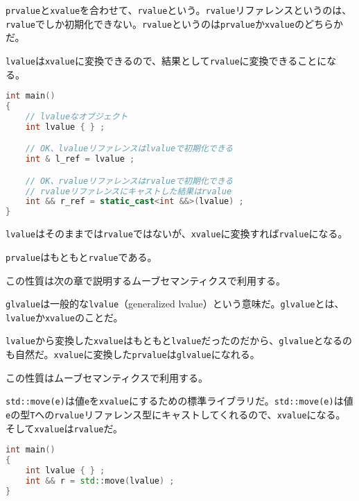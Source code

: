 \texttt{prvalue}と\texttt{xvalue}を合わせて、\texttt{rvalue}という。\texttt{rvalue}リファレンスというのは、\texttt{rvalue}でしか初期化できない。\texttt{rvalue}というのは\texttt{prvalue}か\texttt{xvalue}のどちらかだ。

\texttt{lvalue}は\texttt{xvalue}に変換できるので、結果として\texttt{rvalue}に変換できることになる。

\begin{lstlisting}[language={C++}]
int main()
{
    // lvalueなオブジェクト
    int lvalue { } ;

    // OK、lvalueリファレンスはlvalueで初期化できる
    int & l_ref = lvalue ;

    // OK、rvalueリファレンスはrvalueで初期化できる
    // rvalueリファレンスにキャストした結果はrvalue
    int && r_ref = static_cast<int &&>(lvalue) ;
}
\end{lstlisting}

\texttt{lvalue}はそのままでは\texttt{rvalue}ではないが、\texttt{xvalue}に変換すれば\texttt{rvalue}になる。

\texttt{prvalue}はもともと\texttt{rvalue}である。

この性質は次の章で説明するムーブセマンティクスで利用する。


\texttt{glvalue}は一般的な\texttt{lvalue}（generalized lvalue）という意味だ。\texttt{glvalue}とは、\texttt{lvalue}か\texttt{xvalue}のことだ。

\texttt{lvalue}から変換した\texttt{xvalue}はもともと\texttt{lvalue}だったのだから、\texttt{glvalue}となるのも自然だ。\texttt{xvalue}に変換した\texttt{prvalue}は\texttt{glvalue}になれる。

この性質はムーブセマンティクスで利用する。

\clearpage
{}


\texttt{std::move(e)}は値\texttt{e}を\texttt{xvalue}にするための標準ライブラリだ。\texttt{std::move(e)}は値\texttt{e}の型\texttt{T}への\texttt{rvalue}リファレンス型にキャストしてくれるので、\texttt{xvalue}になる。そして\texttt{xvalue}は\texttt{rvalue}だ。

\begin{lstlisting}[language={C++}]
int main()
{
    int lvalue { } ;
    int && r = std::move(lvalue) ;
}
\end{lstlisting}

